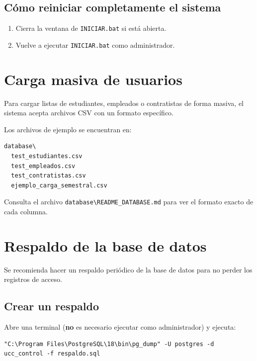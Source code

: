 \documentclass[12pt, a4paper]{article}
\begin{document}
\subsection{Cómo reiniciar completamente el sistema}

\begin{enumerate}
  \item Cierra la ventana de \texttt{INICIAR.bat} si está abierta.
  \item Vuelve a ejecutar \texttt{INICIAR.bat} como administrador.
\end{enumerate}

\section{Carga masiva de usuarios}

Para cargar listas de estudiantes, empleados o contratistas de forma
masiva, el sistema acepta archivos CSV con un formato específico.

Los archivos de ejemplo se encuentran en:
\begin{lstlisting}
database\
  test_estudiantes.csv
  test_empleados.csv
  test_contratistas.csv
  ejemplo_carga_semestral.csv
\end{lstlisting}

Consulta el archivo \texttt{database\textbackslash{}README\_DATABASE.md} para
ver el formato exacto de cada columna.

\section{Respaldo de la base de datos}

Se recomienda hacer un respaldo periódico de la base de datos para
no perder los registros de acceso.

\subsection{Crear un respaldo}

Abre una terminal (\textbf{no} es necesario ejecutar como administrador)
y ejecuta:

\begin{lstlisting}
"C:\Program Files\PostgreSQL\18\bin\pg_dump" -U postgres -d ucc_control -f respaldo.sql
\end{lstlisting}
\end{document}
